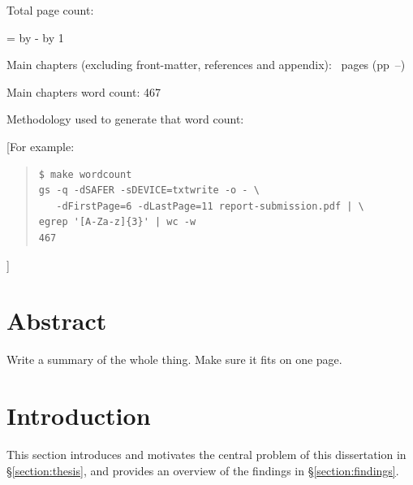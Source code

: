 \documentclass[12pt,a4paper,twoside]{report}
\begin{document}
\begin{sffamily}
Total page count: \pageref{lastpage}

\makeatletter
\@tempcnta=\relax%
\advance\@tempcnta by -%
\advance\@tempcnta by 1%
\xdef\contentpages{\the\@tempcnta}%
\makeatother

Main chapters (excluding front-matter, references and appendix):
\contentpages~pages
(pp~\pageref{firstcontentpage}--\pageref{lastcontentpage})

Main chapters word count: 467

Methodology used to generate that word count:

[For example:

\begin{quote}
\begin{verbatim}
$ make wordcount
gs -q -dSAFER -sDEVICE=txtwrite -o - \
   -dFirstPage=6 -dLastPage=11 report-submission.pdf | \
egrep '[A-Za-z]{3}' | wc -w
467
\end{verbatim}
\end{quote}

]

\end{sffamily}

\onehalfspacing

\chapter*{Abstract}

Write a summary of the whole thing. Make sure it fits on one page.

\tableofcontents

\chapter{Introduction}

\label{firstcontentpage} %

\label{section:introduction}
This section introduces and motivates the central problem of this dissertation in \S\ref{section:thesis}, and provides an overview of the findings in \S\ref{section:findings}.  
\end{document}
